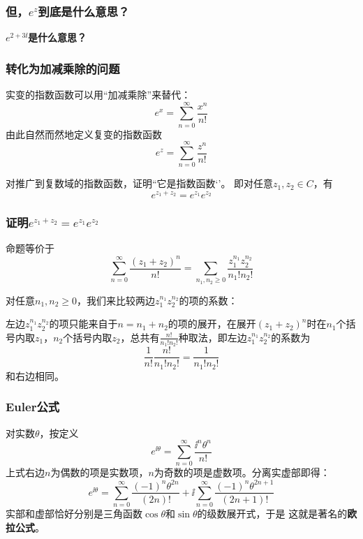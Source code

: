 \documentclass[CJK]{beamer}
\begin{document}
\begin{frame}
  \frametitle{但，$e^z$到底是什么意思？}
  
  \bcenter
  {\Large \bf  $e^{2+3\ii}$是什么意思？}
  \ecenter
  
\end{frame}


\begin{frame}
  \frametitle{转化为加减乘除的问题}
  
  实变的指数函数可以用“加减乘除”来替代：
  $$ e^x  = \sum_{n=0}^{\infty} \frac{x^n}{n!}$$
  由此自然而然地定义复变的指数函数
  $$ e^z = \sum_{n=0}^{\infty} \frac{z^n}{n!}$$
  
\end{frame}

\begin{frame}
  
  
  对推广到复数域的指数函数，证明``它是指数函数‘’。
  即对任意$z_1, z_2\in C$，有
  $$e^{z_1+z_2} = e^{z_1}e^{z_2}$$
  
\end{frame}


\begin{frame}
  \frametitle{证明$e^{z_1+z_2} = e^{z_1}e^{z_2}$}
  
  命题等价于
  $$\sum_{n=0}^\infty \frac{(z_1+z_2)^n}{n!} = \sum_{n_1, n_2\ge 0}\frac{z_1^{n_1}z_2^{n_2}}{n_1!n_2!}$$

  对任意$n_1,n_2\ge0$，我们来比较两边$z_1^{n_1}z_2^{n_2}$的项的系数：
  
  左边$z_1^{n_1}z_2^{n_2}$的项只能来自于$n=n_1+n_2$的项的展开，在展开$(z_1+z_2)^n$时在$n_1$个括号内取$z_1$，$n_2$个括号内取$z_2$，总共有$\frac{n!}{n_1!n_2!}$种取法，即左边$z_1^{n_1}z_2^{n_2}$的系数为
  $$\frac{1}{n!} \frac{n!}{n_1!n_2!} = \frac{1}{n_1!n_2!}$$
  和右边相同。
  
\end{frame}

\begin{frame}
  \frametitle{Euler公式}
  
  对实数$\theta$，按定义
  $$e^{\ii\theta} = \sum_{n=0}^\infty \frac{\ii^n\theta^n}{n!} $$
  上式右边$n$为偶数的项是实数项，$n$为奇数的项是虚数项。分离实虚部即得：
  $$e^{\ii\theta} = \sum_{n=0}^\infty \frac{(-1)^n\theta^{2n}}{(2n)!} + \ii  \sum_{n=0}^\infty \frac{(-1)^n\theta^{2n+1}}{(2n+1)!}$$
  实部和虚部恰好分别是三角函数$\cos\theta$和$\sin\theta$的级数展开式，于是
  这就是著名的{\bf\blue 欧拉公式}。
  
\end{frame}
\end{document}
